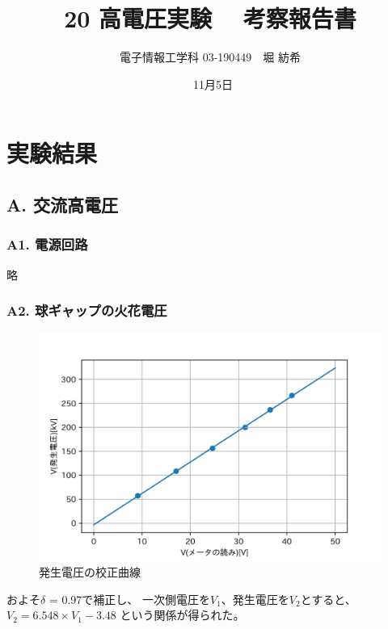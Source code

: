 \documentclass[dvipdfmx, twocolumn]{jsarticle}
\begin{document}
\title{20 高電圧実験　 考察報告書　}
\author{電子情報工学科 03-190449　堀 紡希}
\date{\ 11月5日}
\maketitle

\section{実験結果}
\subsection*{A. 交流高電圧}

\subsubsection*{A1. 電源回路}

略

\subsubsection*{A2. 球ギャップの火花電圧}

\begin{figure}[H]
\begin{center}
\includegraphics[scale = 0.5]{A2.png}
\caption{発生電圧の校正曲線}
\end{center}
\end{figure}
およそ$\delta$ = 0.97で補正し、
一次側電圧を$V_{1}$、発生電圧を$V_{2}$とすると、
$V_{2} = 6.548\times V_{1}-3.48$
という関係が得られた。
\end{document}
